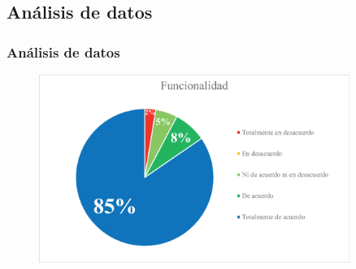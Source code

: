 \documentclass[9pt]{beamer}
\begin{document}


    \subsection{Análisis de datos}
    \begin{frame}      
        \frametitle{Análisis de datos}
        \begin{figure}
            \centering
            \includegraphics[width=0.9\textwidth]{assets/Evaluacion/funcionality.eps}
        \end{figure}
    \end{frame}
\end{document}
